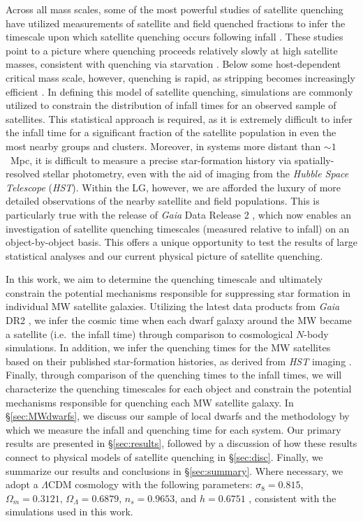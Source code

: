 Across all mass scales, some of the most powerful studies of satellite quenching
have utilized measurements of satellite and field quenched fractions to infer
the timescale upon which satellite quenching occurs following infall
\citep[e.g.][]{wetzel13, fham15, balogh16, fossati17}.
%
These studies point to a picture where quenching proceeds relatively slowly at
high satellite masses, consistent with quenching via starvation
\citep{fham15}. Below some host-dependent critical mass scale, however,
quenching is rapid, as stripping becomes increasingly efficient \citep{fham16}.
%
In defining this model of satellite quenching, simulations are commonly utilized
to constrain the distribution of infall times for an observed sample of
satellites. This statistical approach is required, as it is extremely difficult
to infer the infall time for a significant fraction of the satellite population
in even the most nearby groups and clusters.
%
Moreover, in systems more distant than $\sim1$~Mpc, it is difficult to measure a
precise star-formation history via spatially-resolved stellar photometry, even
with the aid of imaging from the {\it Hubble Space Telescope} ({\it HST}).
%
Within the LG, however, we are afforded the luxury of more detailed observations
of the nearby satellite and field populations. This is particularly true with
the release of {\it Gaia} Data Release 2 \citep[DR2,][]{gaia, gaiaDR2}, which
now enables an investigation of satellite quenching timescales (measured
relative to infall) on an object-by-object basis.
%
This offers a unique opportunity to test the results of large statistical
analyses and our current physical picture of satellite quenching. 


In this work, we aim to determine the quenching timescale and ultimately
constrain the potential mechanisms responsible for suppressing star formation in
individual MW satellite galaxies.
%
Utilizing the latest data products from {\it Gaia} DR2 \citep{gaiaDR2,
  gaiaDR2PM}, we infer the cosmic time when each dwarf galaxy around the MW
became a satellite (i.e.~the infall time) through comparison to cosmological
$N$-body simulations.
%
In addition, we infer the quenching times for the MW satellites based on their
published star-formation histories, as derived from {\it HST} imaging
\citep{weisz14a, weisz15, brown14}. Finally, through comparison of the quenching
times to the infall times, we will characterize the quenching timescales for
each object and constrain the potential mechanisms responsible for quenching
each MW satellite galaxy.
%
In \S\ref{sec:MWdwarfs}, we discuss our sample of local dwarfs and the
methodology by which we measure the infall and quenching time for each system.
%
Our primary results are presented in \S\ref{sec:results}, followed by a
discussion of how these results connect to physical models of satellite
quenching in \S\ref{sec:disc}. Finally, we summarize our results and
conclusions in \S\ref{sec:summary}.
%
Where necessary, we adopt a $\Lambda$CDM cosmology with the following
parameters: $\sigma_8 = 0.815$, $\Omega_{m} =
0.3121$, $\Omega_{\Lambda} = 0.6879$, $n_{s} = 0.9653$, and $h =
0.6751$ \citep{planck16}, consistent with the simulations used in this
work.


